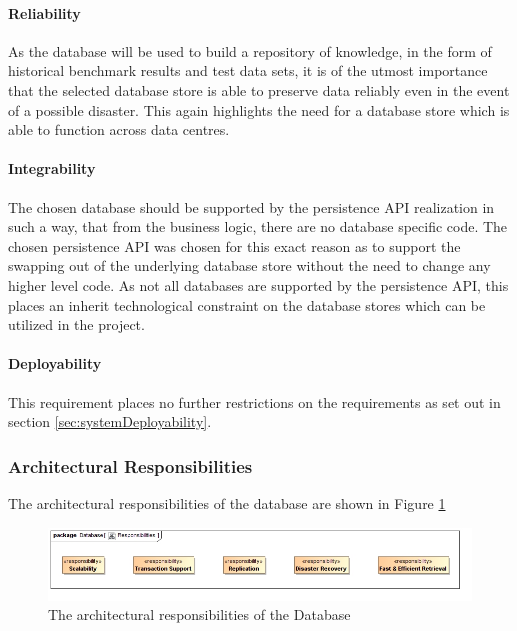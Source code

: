 \paragraph{Reliability}
As the database will be used to build a repository of knowledge, in the form of
historical benchmark results and test data sets, it is of the utmost importance
that the selected database store is able to preserve data reliably even in the
event of a possible disaster. This again highlights the need for a database
store which is able to function across data centres.

\paragraph{Integrability}
The chosen database should be supported by the persistence API realization
in such a way, that from the business logic, there are no database specific
code. The chosen persistence API was chosen for this exact reason as to support
the swapping out of the underlying database store without the need to change any
higher level code. As not all databases are supported by the persistence API,
this places an inherit technological constraint on the database stores which can
be utilized in the project.

\paragraph{Deployability}
This requirement places no further restrictions on the requirements as set out
in section \ref{sec:systemDeployability}.

\subsubsection{Architectural Responsibilities}
The architectural responsibilities of the database are shown in 
Figure \ref{fig:databaseResponsibilities}
\begin{figure}[H]
	\begin{center}
	\includegraphics[scale=0.5]{../Diagrams and Charts/Database/Responsibilities.jpg}
	\caption{The architectural responsibilities of the Database}
	\label{fig:databaseResponsibilities}
	\end{center}
\end{figure}

